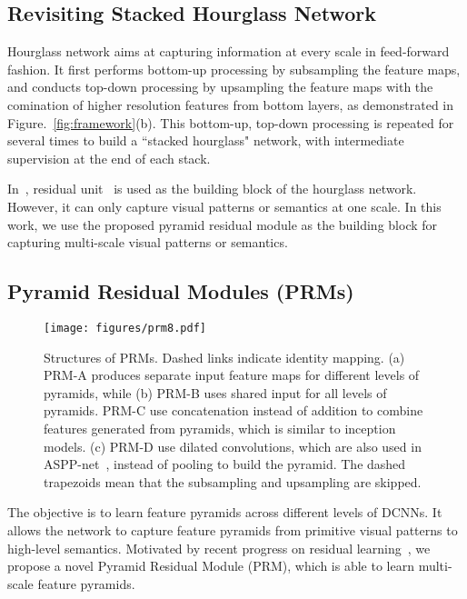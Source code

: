 \documentclass[10pt,twocolumn,letterpaper]{article}
\begin{document}
\subsection{Revisiting Stacked Hourglass Network}
Hourglass network aims at capturing information at every scale in feed-forward fashion. It first performs bottom-up processing by subsampling the feature maps, and conducts top-down processing by upsampling the feature maps with the comination of higher resolution features from bottom layers, as demonstrated in Figure.~\ref{fig:framework}(b). 
This bottom-up, top-down processing is repeated for several times to build a ``stacked hourglass" network, with intermediate supervision at the end of each stack. 

In~\cite{newell2016stacked}, residual unit~\cite{he2016identity} is used as the building block of the hourglass network. 
However, it can only capture visual patterns or semantics at one scale. 
In this work, we use the proposed pyramid residual module as the building block for capturing multi-scale visual patterns or semantics. 


\subsection{Pyramid Residual Modules (PRMs)}\label{sec:prm}

\begin{figure*}[t]
	\begin{center}
		\texttt{[image: figures/prm8.pdf]}
	\end{center}
	\caption{Structures of PRMs. Dashed links indicate identity mapping. 
		(a) PRM-A produces separate input feature maps for different levels of pyramids, while (b) PRM-B uses shared input for all levels of pyramids. 
		PRM-C use concatenation instead of addition to combine features generated from pyramids, which is similar to inception models. 
		(c) PRM-D use dilated convolutions, which are also used in ASPP-net~\cite{chen2016deeplab}, instead of pooling to build the pyramid. 
The dashed trapezoids mean that the subsampling and upsampling are skipped. }
	\label{fig:pyramidmodule}
	\vspace{-1em}
\end{figure*}


The objective is to learn feature pyramids across different levels of DCNNs. 
It allows the network to capture feature pyramids from primitive visual patterns to high-level semantics. 
Motivated by recent progress on residual learning~\cite{he2016deep,he2016identity}, we propose a novel Pyramid Residual Module (PRM), which is able to learn multi-scale feature pyramids.
\end{document}
